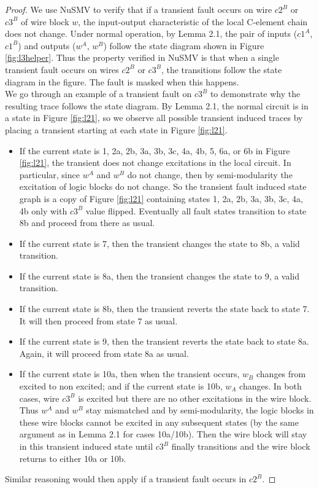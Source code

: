 \documentclass[12pt]{report}
\begin{document}
\begin{proof}
We use NuSMV to verify that if a transient fault occurs on wire $c2^B$ or $c3^B$ of wire block $w$, the input-output characteristic of the local C-element chain does not change.  Under normal operation, by Lemma 2.1, the pair of inputs ($c1^A$, $c1^B$) and outputs ($w^A$, $w^B$) follow the state diagram shown in Figure \ref{fig:l3helper}.  Thus the property verified in NuSMV is that when a single transient fault occurs on wires $c2^B$ or $c3^B$, the transitions follow the state diagram in the figure.  The fault is masked when this happens. \\
We go through an example of a transient fault on $c3^B$ to demonstrate why the resulting trace follows the state diagram.  By Lemma 2.1, the normal circuit is in a state in Figure \ref{fig:l21}, so we observe all possible transient induced traces by placing a transient starting at each state in Figure \ref{fig:l21}.
\begin{itemize}
	\item
If the current state is 1, 2a, 2b, 3a, 3b, 3c, 4a, 4b, 5, 6a, or 6b in Figure \ref{fig:l21}, the transient does not change excitations in the local circuit.  In particular, since $w^A$ and $w^B$ do not change, then by semi-modularity the excitation of logic blocks do not change.  So the transient fault induced state graph is a copy of Figure \ref{fig:l21} containing states 1, 2a, 2b, 3a, 3b, 3c, 4a, 4b only with $c3^B$ value flipped. Eventually all fault states transition to state 8b and proceed from there as usual.
	\item
If the current state is 7, then the transient changes the state to 8b, a valid transition.	
      \item
If the current state is 8a, then the transient changes the state to 9, a valid transition.	
	\item
      If the current state is 8b, then the transient reverts the state back to state 7.  It will then proceed from state 7 as usual.   
	\item
If the current state is 9, then the transient reverts the state back to state 8a.  Again, it will proceed from state 8a as usual.  
	\item
If the current state is 10a, then when the transient occurs, $w_B$ changes from excited to non excited; and if the current state is 10b, $w_A$ changes.  In both cases, wire $c3^B$ is excited but there are no other excitations in the wire block.  Thus $w^A$ and $w^B$ stay mismatched and by semi-modularity, the logic blocks in these wire blocks cannot be excited in any subsequent states (by the same argument as in Lemma 2.1 for cases 10a/10b).  Then the wire block will stay in this transient induced state until $c3^B$ finally transitions and the wire block returns to either 10a or 10b.
\end{itemize}
Similar reasoning would then apply if a transient fault occurs in $c2^B$.  
\end{proof}
\end{document}
